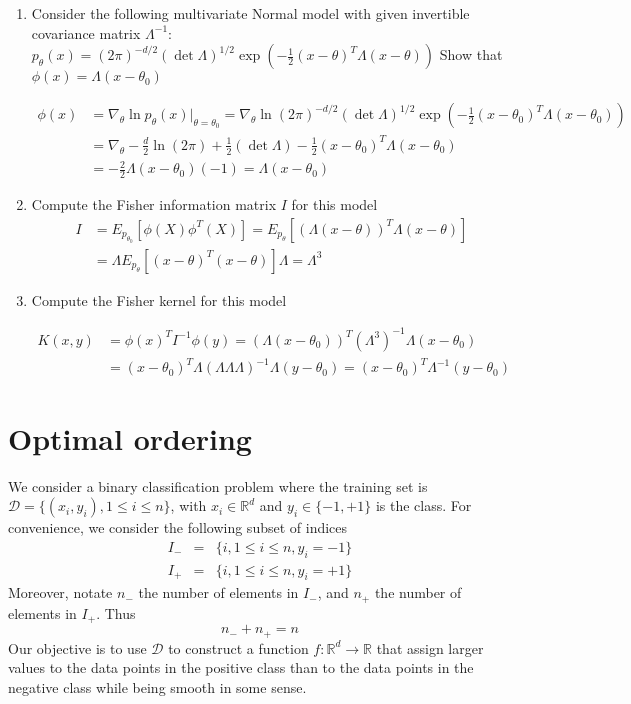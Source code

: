 \documentclass[11pt]{article}
\begin{document}
\begin{enumerate}
\item
Consider the following multivariate Normal model with given invertible covariance matrix $\Lambda^{-1}$: 
$p_\theta(x)=(2\pi)^{-d/2}(\det{\Lambda})^{1/2}\exp\left(-\frac{1}{2}(x-\theta)^T\Lambda (x-\theta)\right)$
Show that 
$\phi(x)=\Lambda (x - \theta_0)$



\begin{align*}
\phi(x)&=\nabla_\theta \ln p_{\theta}(x) |_{\theta=\theta_0}=\nabla_\theta \ln(2\pi)^{-d/2}(\det{\Lambda})^{1/2}\exp\left(-\frac{1}{2}(x-\theta_0)^T\Lambda (x-\theta_0)\right)\\
&=\nabla_\theta -\frac{d}2\ln(2\pi)+\frac{1}2(\det{\Lambda})-\frac{1}2(x-\theta_0)^T\Lambda (x-\theta_0)\\
&=-\frac{2}2\Lambda (x-\theta_0)(-1)=\Lambda (x - \theta_0)
\end{align*}



\item Compute the Fisher information matrix $I$ for this model
\begin{align*}
I &= E_{p_{\theta_0}}[\phi(X)\phi^T(X)]=E_{p_{\theta}}[(\Lambda (x - \theta))^T\Lambda (x - \theta)]\\
  &=\Lambda E_{p_{\theta}}[(x - \theta)^T (x - \theta)]\Lambda=\Lambda^3
\end{align*}

\item Compute the Fisher kernel for this model

\begin{align*}
K(x,y)&=\phi(x)^T I^{-1} \phi(y)=(\Lambda (x - \theta_0))^T(\Lambda^3)^{-1}\Lambda (x - \theta_0)\\
  &=(x - \theta_0)^T\Lambda(\Lambda\Lambda\Lambda)^{-1}\Lambda (y - \theta_0)=(x-\theta_0)^T\Lambda^{-1}(y - \theta_0)
\end{align*}



\end{enumerate}

\section{Optimal ordering}
We consider a binary classification problem where the training set is $\mathcal{D}=\{(x_i,y_i), 1\leq i \leq n\}$, with $x_i \in \mathbb{R}^d$ and $y_i \in \{-1,+1\}$ is the class. For convenience, we consider the following subset of indices 
\begin{eqnarray}
I_-&=&\{i, 1\leq i \leq n, y_i=-1\}\\
I_+&=& \{i, 1\leq i \leq n, y_i=+1\}
\end{eqnarray}
Moreover, notate $n_-$ the number of elements in $I_-$, and $n_+$ the number of elements in $I_+$. Thus 
\begin{equation}
n_-+n_+=n
\end{equation}
 Our objective is to use $\mathcal{D}$ to construct a function $f:\mathbb{R}^d \to \mathbb{R}$ that assign larger values to the data points in the positive class than to the data points in the negative class while being smooth in some sense. 
\end{document}
